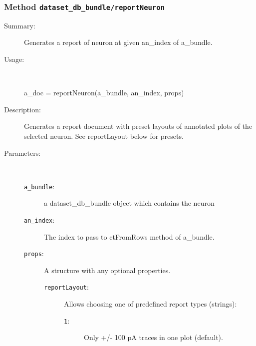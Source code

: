 \subsubsection[Method \texttt{reportNeuron}]{Method \texttt{dataset\_db\_bundle/reportNeuron}}%
%
\label{ref_dataset_db_bundle__reportNeuron}%
\hypertarget{ref_dataset_db_bundle__reportNeuron}{}%
\begin{description}
\item[Summary:]Generates a report of neuron at given an\_index of a\_bundle.
%
\item[Usage:]~%
\begin{lyxcode}%
a\_doc = reportNeuron(a\_bundle, an\_index, props)
%
\end{lyxcode}%
%
\item[Description:]%
Generates a report document with preset layouts of annotated plots of
 the selected neuron. See reportLayout below for presets.
\item[Parameters:]~
\begin{description}%
\item[\texttt{a\_bundle}:]
 a dataset\_db\_bundle object which contains the neuron
\item[\texttt{an\_index}:]
 The index to pass to ctFromRows method of a\_bundle.
\item[\texttt{props}:]
 A structure with any optional properties.
\begin{description}%
\item[\texttt{reportLayout}:]
 Allows choosing one of predefined report types (strings):
\begin{description}%
\item[\texttt{1}:]
 Only +/- 100 pA traces in one plot (default).


\end{description}
\end{description}
\end{description}
\end{description}
